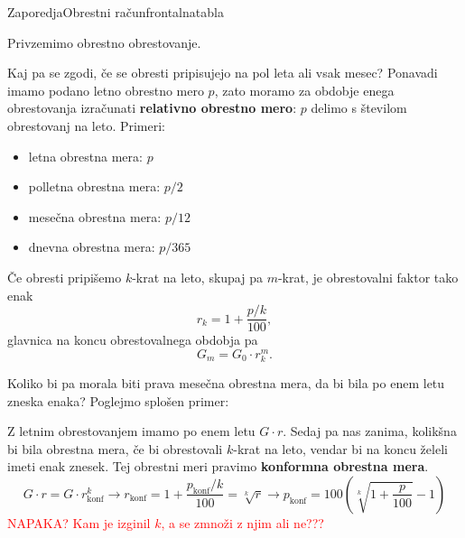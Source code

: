\begin{priprava}{}{}{Zaporedja}{Obrestni račun}{frontalna}{tabla}

\newpage


Privzemimo obrestno obrestovanje.

Kaj pa se zgodi, če se obresti pripisujejo na pol leta ali vsak mesec? Ponavadi imamo podano letno obrestno mero $ p $, zato moramo za obdobje enega obrestovanja izračunati \textbf{relativno obrestno mero}: $ p $ delimo s številom obrestovanj na leto. Primeri:
\begin{itemize}
    \item letna obrestna mera: $ p $
    \item polletna obrestna mera: $ p/2 $
    \item mesečna obrestna mera: $ p/12 $
    \item dnevna obrestna mera: $ p/365 $
\end{itemize}

Če obresti pripišemo $ k $-krat na leto, skupaj pa $ m $-krat, je obrestovalni faktor tako enak
$$ r_k = 1 + \frac{p/k}{100}, $$
glavnica na koncu obrestovalnega obdobja pa
$$ G_m = G_0 \cdot r_k^m. $$


Koliko bi pa morala biti prava mesečna obrestna mera, da bi bila po enem letu zneska enaka? Poglejmo splošen primer:

Z letnim obrestovanjem imamo po enem letu $ G \cdot r $. Sedaj pa nas zanima, kolikšna bi bila obrestna mera, če bi obrestovali $ k $-krat na leto, vendar bi na koncu želeli imeti enak znesek. Tej obrestni meri pravimo \textbf{konformna obrestna mera}.
$$ G \cdot r = G \cdot r_\text{konf}^k  \longrightarrow r_\text{konf} = 1 + \frac{p_\text{konf}/k}{100} = \sqrt[k]{r} \longrightarrow p_\text{konf} = 100 (\sqrt[k]{1+\frac{p}{100}} - 1)$$ \textcolor{red}{NAPAKA? Kam je izginil $ k $, a se zmnoži z njim ali ne???}


\end{priprava}

